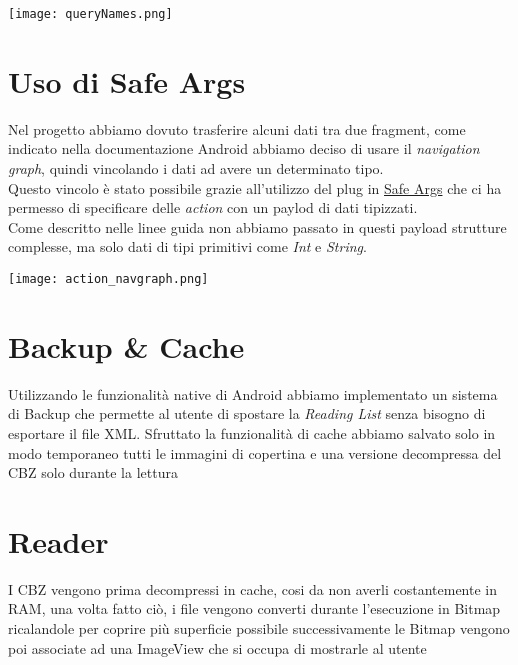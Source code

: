\documentclass[../Assignment-3-LPSMT.tex]{subfiles}
\begin{document}
\begin{center}
  \texttt{[image: queryNames.png]}
\end{center}

\section{Uso di Safe Args}

Nel progetto abbiamo dovuto trasferire alcuni dati tra due fragment, come indicato nella documentazione Android abbiamo deciso di usare il \emph{navigation graph}, quindi vincolando i dati ad avere un determinato tipo.\\
Questo vincolo è stato possibile grazie all'utilizzo del plug in \href{https://developer.android.com/guide/navigation/use-graph/pass-data#Safe-args}{Safe Args} che ci ha permesso di specificare delle \emph{action} con un paylod di dati tipizzati.\\
Come descritto nelle linee guida non abbiamo passato in questi payload strutture complesse, ma solo dati di tipi primitivi come \emph{Int} e \emph{String}.

\begin{center}
  \texttt{[image: action\_navgraph.png]}
\end{center}

\section{Backup \& Cache}

Utilizzando le funzionalità native di Android abbiamo implementato un sistema
di Backup che permette al utente di spostare la \emph{Reading List} senza bisogno
di esportare il file XML. Sfruttato la funzionalità di cache abbiamo salvato solo
in modo temporaneo tutti le immagini di copertina e una versione decompressa del
CBZ solo durante la lettura

\section{Reader}

I CBZ vengono prima decompressi in cache, cosi da non averli costantemente in RAM,
una volta fatto ciò, i file vengono converti durante l'esecuzione in Bitmap
ricalandole per coprire più superficie possibile successivamente le Bitmap
vengono poi associate ad una ImageView che si occupa di mostrarle al utente
\end{document}
